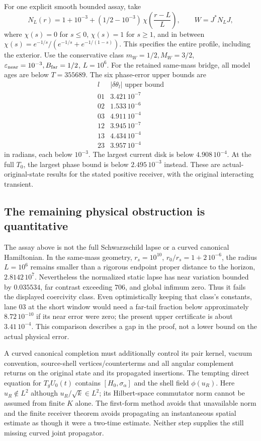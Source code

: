 \documentclass[10pt,twocolumn,letterpaper]{article}
\begin{document}
For one explicit smooth bounded assay, take
\[
 N_L(r)=1+10^{-3}+(1/2-10^{-3})\,
             \chi\!\left(\frac{r-L}{L}\right),\qquad W=J^*N_LJ,
\]
where $\chi(s)=0$ for $s\le0$, $\chi(s)=1$ for $s\ge1$, and in between
$\chi(s)=e^{-1/s}/(e^{-1/s}+e^{-1/(1-s)})$.
This specifies the entire profile, including the exterior.
Use the conservative class $m_W=1/2,M_W=3/2$,
$\varepsilon_{\rm near}=10^{-3},B_{\rm far}=1/2$, $L=10^6$.
For the retained same-mass bridge, all model ages are below $T=355689$.
The six phase-error upper bounds are
\[
 \begin{array}{c|r}
 l& |\delta\theta_l|\text{ upper bound}\\\hline
 01&3.421\,10^{-7}\\
 02&1.533\,10^{-6}\\
 03&4.911\,10^{-4}\\
 12&3.945\,10^{-7}\\
 13&4.434\,10^{-4}\\
 23&3.957\,10^{-4}
 \end{array}
\]
in radians, each below $10^{-3}$.  The largest current disk is below
$4.908\,10^{-4}$.  At the full $T_0$, the largest phase bound is below
$2.495\,10^{-3}$ instead.  These are actual-original-state results for
the stated positive receiver, with the original interacting transient.

\subsection{The remaining physical obstruction is quantitative}
The assay above is not the full Schwarzschild lapse or a curved canonical
Hamiltonian.  In the same-mass geometry, $r_s=10^{10}$,
$r_0/r_s=1+2\,10^{-6}$, the radius $L=10^6$ remains smaller than a
rigorous endpoint proper distance to the horizon, $2.8142\,10^7$.
Nevertheless the normalized static lapse has near variation bounded by
$0.035534$, far contrast exceeding $706$, and global infimum zero.
Thus it fails the displayed coercivity class.  Even optimistically keeping
that class's constants, lane $03$ at the short window would need a
far-tail fraction below approximately $8.72\,10^{-10}$ if its near error
were zero; the present upper certificate is about $3.41\,10^{-4}$.
This comparison describes a gap in the proof, not a lower bound on the
actual physical error.

A curved canonical completion must additionally control its pair kernel,
vacuum convention, source-shell vertices/counterterms and all angular
complement returns on the original state and its propagated insertions.
The tempting direct equation for $T_gU_0(t)$ contains
$[H_0,\sigma_\alpha]$ and the shell field $\phi(u_R)$.
Here $u_R\notin L^2$ although $u_R/\sqrt{k}\in L^2$; its Hilbert-space
commutator norm cannot be assumed from finite $K$ alone.
The first-form method avoids that unavailable norm and the finite receiver
theorem avoids propagating an instantaneous spatial estimate as though it
were a two-time estimate.  Neither step supplies the still missing curved
joint propagator.
\end{document}
